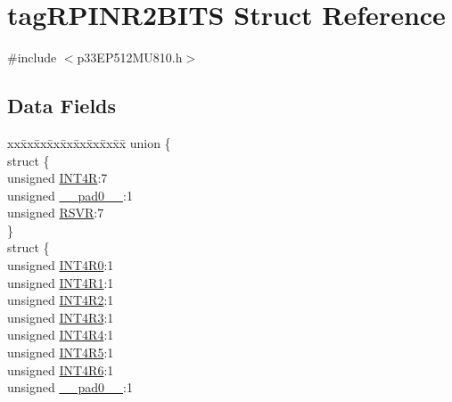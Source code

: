 \hypertarget{structtag_r_p_i_n_r2_b_i_t_s}{}\section{tag\+R\+P\+I\+N\+R2\+B\+I\+TS Struct Reference}
\label{structtag_r_p_i_n_r2_b_i_t_s}


{\ttfamily \#include $<$p33\+E\+P512\+M\+U810.\+h$>$}

\subsection*{Data Fields}
\begin{DoxyCompactItemize}
\item 
\begin{tabbing}
xx\=xx\=xx\=xx\=xx\=xx\=xx\=xx\=xx\=\kill
union \{\\
\>struct \{\\
\>\>unsigned \hyperlink{structtag_r_p_i_n_r2_b_i_t_s_a685f858313ac6a95fb1580424dd4bbfb}{INT4R}:7\\
\>\>unsigned \hyperlink{structtag_r_p_i_n_r2_b_i_t_s_adf71f3d8410c1f1dbbc96680a92c49af}{\_\_pad0\_\_}:1\\
\>\>unsigned \hyperlink{structtag_r_p_i_n_r2_b_i_t_s_a4e8d5f3c309f7fe12ede883e07d758ef}{RSVR}:7\\
\>\} \\
\>struct \{\\
\>\>unsigned \hyperlink{structtag_r_p_i_n_r2_b_i_t_s_a20e52bb1cb6d23f1595f1e440a4acce5}{INT4R0}:1\\
\>\>unsigned \hyperlink{structtag_r_p_i_n_r2_b_i_t_s_ad686b24cb1eead45f94892c4bbbf0fc2}{INT4R1}:1\\
\>\>unsigned \hyperlink{structtag_r_p_i_n_r2_b_i_t_s_a70cedc67a7809b209715e359048fa095}{INT4R2}:1\\
\>\>unsigned \hyperlink{structtag_r_p_i_n_r2_b_i_t_s_a3a79a540f5479b6792a4b95a509b8dd2}{INT4R3}:1\\
\>\>unsigned \hyperlink{structtag_r_p_i_n_r2_b_i_t_s_ab7675fccc75f445e5b8cbb9749061de0}{INT4R4}:1\\
\>\>unsigned \hyperlink{structtag_r_p_i_n_r2_b_i_t_s_a620ab0c6d43006a89ade62667a7787b4}{INT4R5}:1\\
\>\>unsigned \hyperlink{structtag_r_p_i_n_r2_b_i_t_s_abe82c7ff735d5c6ebce57dad4a300ac1}{INT4R6}:1\\
\>\>unsigned \hyperlink{structtag_r_p_i_n_r2_b_i_t_s_adf71f3d8410c1f1dbbc96680a92c49af}{\_\_pad0\_\_}:1\\

\end{tabbing}
\end{DoxyCompactItemize}
